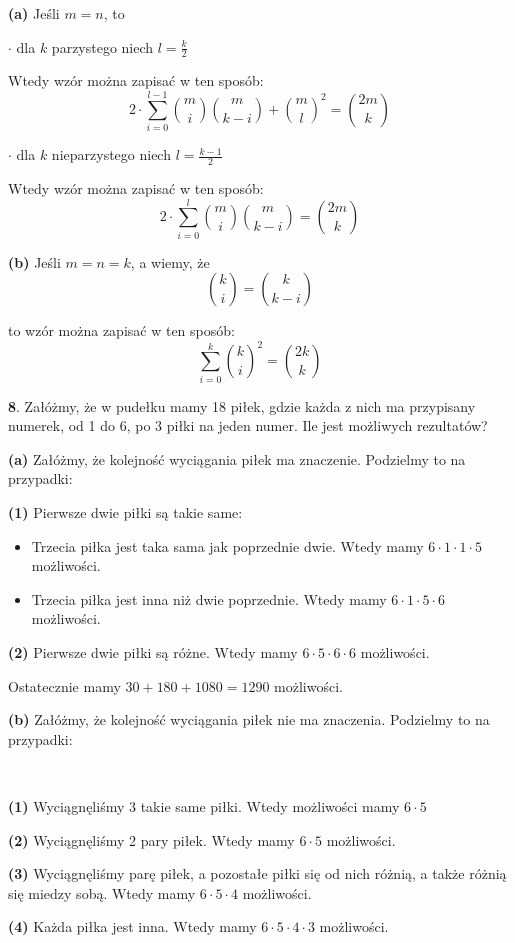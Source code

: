 \documentclass{article}
\begin{document}
\textbf{(a)} Jeśli $m=n$, to 

$\cdot$ dla $k$ parzystego niech $l=\frac{k}{2}$

Wtedy wzór można zapisać w ten sposób:
$$2\cdot\sum_{i=0}^{l-1} {m\choose i}{m\choose k-i}+{m\choose l}^2={2m\choose k}$$

$\cdot$ dla $k$ nieparzystego niech $l=\frac{k-1}{2}$

Wtedy wzór można zapisać w ten sposób:
$$2\cdot\sum_{i=0}^{l} {m\choose i}{m\choose k-i}={2m\choose k}$$


\textbf{(b)} Jeśli $m=n=k$, a wiemy, że $${k \choose i}={k \choose k-i}$$

to wzór można zapisać w ten sposób:
$$\sum_{i=0}^k {k\choose i}^2={2k\choose k}$$


\begin{flushleft}
\large \textbf{8}. Załóżmy, że w pudełku mamy 18 piłek, gdzie każda z nich ma przypisany numerek, od 1 do 6, po 3 piłki na jeden numer. Ile jest możliwych rezultatów? 
\end{flushleft}

\textbf{(a)} Załóżmy, że kolejność wyciągania piłek ma znaczenie. Podzielmy to na przypadki:

\textbf{(1)} Pierwsze dwie piłki są takie same: 
\begin{itemize}
    \item Trzecia piłka jest taka sama jak poprzednie dwie. Wtedy mamy $6\cdot1\cdot1\cdot5$ możliwości.
    \item Trzecia piłka jest inna niż dwie poprzednie. Wtedy mamy $6\cdot1\cdot5\cdot6$ możliwości.
\end{itemize}

\textbf{(2)} Pierwsze dwie piłki są różne. Wtedy mamy $6\cdot5\cdot6\cdot6$ możliwości.

Ostatecznie mamy $30+180+1080=1290$ możliwości.

\textbf{(b)} Załóżmy, że kolejność wyciągania piłek nie ma znaczenia. Podzielmy to na przypadki:

\ 

\textbf{(1)} Wyciągnęliśmy 3 takie same piłki. Wtedy możliwości mamy $6\cdot5$

\textbf{(2)} Wyciągnęliśmy 2 pary piłek. Wtedy mamy $6\cdot5$ możliwości.

\textbf{(3)} Wyciągnęliśmy parę piłek, a pozostałe piłki się od nich różnią, a także różnią się miedzy sobą. Wtedy mamy $6\cdot5\cdot4$ możliwości.

\textbf{(4)} Każda piłka jest inna. Wtedy mamy $6\cdot5\cdot4\cdot3$ możliwości.
\end{document}
